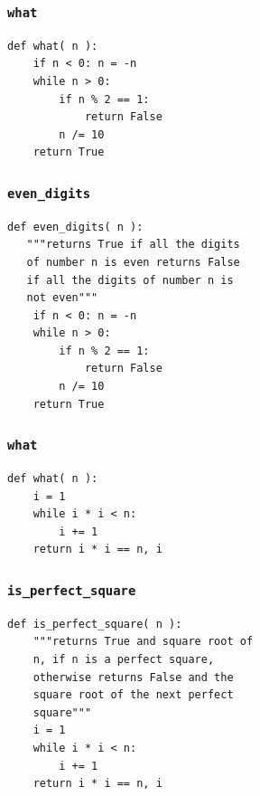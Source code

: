 \documentclass[17pt]{beamer}
\begin{document}
\begin{frame}[fragile]
\frametitle{\texttt{what}}
\label{sec-12}

\lstset{language=Python}
\begin{small}
\begin{lstlisting}
def what( n ):
    if n < 0: n = -n
    while n > 0:
        if n % 2 == 1:
            return False
        n /= 10
    return True
\end{lstlisting}
\end{small}
\end{frame}
\begin{frame}[fragile]
\frametitle{\texttt{even\_digits}}
\label{sec-13}

\lstset{language=Python}
\begin{small}
\begin{lstlisting}
def even_digits( n ):
   """returns True if all the digits 
   of number n is even returns False 
   if all the digits of number n is 
   not even"""
    if n < 0: n = -n
    while n > 0:
        if n % 2 == 1:
            return False
        n /= 10
    return True
\end{lstlisting}
\end{small}
\end{frame}
\begin{frame}[fragile]
\frametitle{\texttt{what}}
\label{sec-14}

\lstset{language=Python}
\begin{lstlisting}
def what( n ):
    i = 1
    while i * i < n:
        i += 1
    return i * i == n, i
\end{lstlisting}
\end{frame}
\begin{frame}[fragile]
\frametitle{\texttt{is\_perfect\_square}}
\label{sec-15}

\lstset{language=Python}
\begin{small}
\begin{lstlisting}
def is_perfect_square( n ):
    """returns True and square root of 
    n, if n is a perfect square, 
    otherwise returns False and the 
    square root of the next perfect 
    square"""
    i = 1
    while i * i < n:
        i += 1
    return i * i == n, i
\end{lstlisting}
\end{small}
\end{frame}
\end{document}
